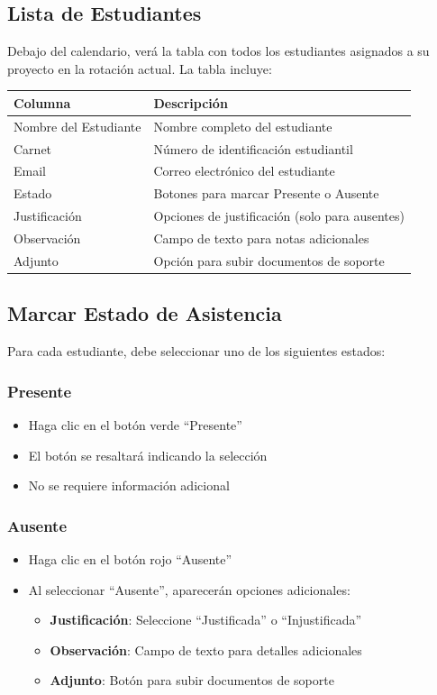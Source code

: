 \documentclass[11pt,a4paper]{article}
\begin{document}
\subsection{Lista de Estudiantes}

Debajo del calendario, verá la tabla con todos los estudiantes asignados a su proyecto en la rotación actual. La tabla incluye:

\begin{center}
\begin{tabular}{lp{8cm}}
\toprule
\textbf{Columna} & \textbf{Descripción} \\
\midrule
Nombre del Estudiante & Nombre completo del estudiante \\
Carnet & Número de identificación estudiantil \\
Email & Correo electrónico del estudiante \\
Estado & Botones para marcar Presente o Ausente \\
Justificación & Opciones de justificación (solo para ausentes) \\
Observación & Campo de texto para notas adicionales \\
Adjunto & Opción para subir documentos de soporte \\
\bottomrule
\end{tabular}
\end{center}

\subsection{Marcar Estado de Asistencia}

Para cada estudiante, debe seleccionar uno de los siguientes estados:

\subsubsection{Presente}
\begin{itemize}
  \item Haga clic en el botón verde ``Presente''
  \item El botón se resaltará indicando la selección
  \item No se requiere información adicional
\end{itemize}

\subsubsection{Ausente}
\begin{itemize}
  \item Haga clic en el botón rojo ``Ausente''
  \item Al seleccionar ``Ausente'', aparecerán opciones adicionales:
    \begin{itemize}
      \item \textbf{Justificación}: Seleccione ``Justificada'' o ``Injustificada''
      \item \textbf{Observación}: Campo de texto para detalles adicionales
      \item \textbf{Adjunto}: Botón para subir documentos de soporte
    \end{itemize}
\end{itemize}
\end{document}
